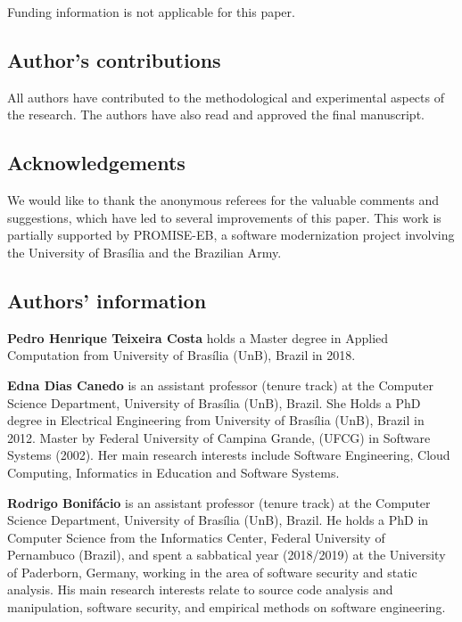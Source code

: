 \documentclass[AMA,STIX1COL,hidelinks]{WileyNJD-v2}
\begin{document}
Funding information is not applicable for this paper.


\subsection{Author's contributions}

All authors have contributed to the methodological and experimental aspects
of the research. The authors have also read and approved the final manuscript. 

\subsection{Acknowledgements}

We would like to thank the anonymous referees for the valuable comments and suggestions, which have led to several improvements of this paper. This work is partially supported by \textsc{PROMISE-EB}, a software modernization project involving the University of Bras\'{i}lia and the Brazilian Army.
  
\subsection{Authors' information}

\textbf{Pedro Henrique Teixeira Costa} holds a Master degree in Applied Computation from University of Bras\'{i}lia (UnB), Brazil in 2018.

\textbf{Edna Dias Canedo} is an assistant professor (tenure track) at the Computer Science Department, University of Bras\'{i}lia (UnB), Brazil. She Holds a PhD degree in Electrical Engineering from University of Bras\'{i}lia (UnB), Brazil in 2012. Master by Federal University of Campina Grande, (UFCG) in Software Systems (2002). Her main research interests include Software Engineering, Cloud Computing, Informatics in Education and Software Systems.

\textbf{Rodrigo Bonif\'{a}cio} is an assistant professor (tenure track) at the Computer Science Department, University of Bras\'{i}lia (UnB), Brazil. He holds a PhD in Computer Science from the Informatics Center, Federal University of Pernambuco (Brazil), and spent a sabbatical year (2018/2019) at the University of Paderborn, Germany, working in the area of software security and static analysis. His main research interests relate to source code analysis and manipulation, software security, and empirical methods on software engineering. 







\end{document}
